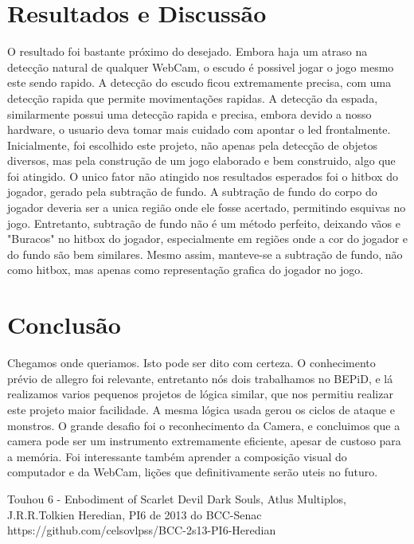 \documentclass[12pt]{sciposter}
\begin{document}
\begin{multicols}{3}
\section{Resultados e Discussão}

O resultado foi bastante próximo do desejado. Embora haja um atraso na detecção natural de qualquer WebCam, o escudo é possivel jogar o jogo mesmo este sendo rapido.
A detecção do escudo ficou extremamente precisa, com uma detecção rapida que permite movimentações rapidas. A detecção da espada, similarmente possui uma detecção rapida e precisa, embora devido a nosso hardware, o usuario deva tomar mais  cuidado com apontar o led frontalmente.
Inicialmente, foi escolhido este projeto, não apenas pela detecção de objetos diversos, mas pela construção de um jogo elaborado e bem construido, algo que foi atingido.
O unico fator não atingido nos resultados esperados foi o hitbox do jogador, gerado pela subtração de fundo. A subtração de fundo do corpo do jogador deveria ser a unica região onde ele fosse acertado, permitindo esquivas no jogo.
Entretanto, subtração de fundo não é um método perfeito, deixando vãos e "Buracos" no hitbox do jogador, especialmente em regiões onde a cor do jogador e do fundo são bem similares.
Mesmo assim, manteve-se a subtração de fundo, não como hitbox, mas apenas como representação grafica do jogador no jogo.

\section{Conclusão}
Chegamos onde queriamos. Isto pode ser dito com certeza.
O conhecimento prévio de allegro foi relevante, entretanto nós dois trabalhamos no BEPiD, e lá realizamos varios pequenos projetos de lógica similar, que nos permitiu realizar este projeto maior facilidade. A mesma lógica usada gerou os ciclos de ataque e monstros.
O grande desafio foi o reconhecimento da Camera, e concluimos que a camera pode ser um instrumento extremamente eficiente, apesar de custoso para a memória. Foi interessante também aprender a composição visual do computador e da WebCam, lições que definitivamente serão uteis no futuro.




\begin{thebibliography}{1}

Touhou 6 - Enbodiment of Scarlet Devil
\newblock
{}
Dark Souls, Atlus
\newblock
{}
Multiplos, J.R.R.Tolkien
\newblock
{}
Heredian, PI6 de 2013 do BCC-Senac
\newblock https://github.com/celsovlpss/BCC-2s13-PI6-Heredian



\end{thebibliography}

\end{multicols}
\end{document}

